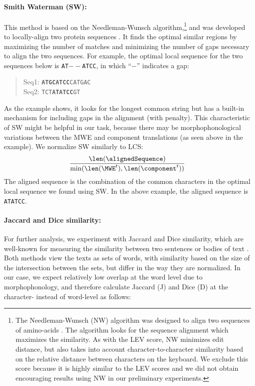 \documentclass[output=paper
,modfonts
,nonflat]{langsci/langscibook}
\begin{document}
\paragraph*{Smith Waterman (SW):}
This method is based on the Needleman-Wunsch algorithm,\footnote{The
 Needleman-Wunsch (NW) algorithm was designed to align two sequences
 of amino-acids \citep{needleman1970}. The algorithm looks for the
 sequence alignment which maximizes the similarity. As with the LEV
 score, NW minimizes edit distance, but also takes into account
 character-to-character similarity based on the relative distance
 between characters on the keyboard. We exclude this score because
 it is highly similar to the LEV scores and we did not obtain
 encouraging results using NW in our preliminary experiments.} and
was developed to locally-align two protein sequences
\citep{smith1981}. It finds the optimal similar regions by maximizing
the number of matches and minimizing the number of gaps necessary to
align the two sequences. For example, the optimal local sequence for
the two sequences below is \texttt{AT$--$ATCC}, in which
``\texttt{$-$}'' indicates a gap:
\begin{quote}
Seq1: \texttt{\textbf{ATGCATCC}CATGAC}\\
Seq2: \texttt{TCT\textbf{ATATCC}GT}
\end{quote}
As the example shows, it looks for the longest common string but has a
built-in mechanism for including gaps in the alignment (with
penalty). This characteristic of SW might be helpful in our task,
because there may be morphophonological variations between the MWE and
component translations (as seen above in the 
example). We normalize SW similarly to LCS:
\begin{eqnarray}
\frac{\len(\alignedSequence)}{\min(\len(\MWE^t),\len(\component^t))}
\end{eqnarray}
The aligned sequence is the combination of the common characters in the
optimal local sequence we found using SW. In the above example, the
aligned sequence is \texttt{ATATCC}.



\paragraph*{Jaccard and Dice similarity:}
For further analysis, we experiment with Jaccard and Dice similarity,
which are well-known for measuring the similarity between two
sentences or bodies of text \citep{gomaa2013survey}.
Both methods view the texts as sets of words, with similarity based on
the size of the intersection between the sets, but differ in the
way they are normalized. In our case, we expect relatively low overlap
at the word level due to morphophonology, and therefore calculate
Jaccard (J) and Dice (D) at the character- instead of word-level as
follows:
\end{document}
